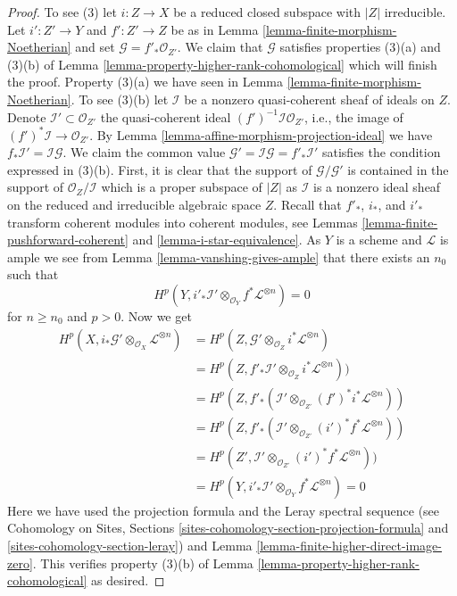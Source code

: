 \begin{proof}
\medskip\noindent
To see (3) let $i : Z \to X$ be a reduced closed subspace with $|Z|$
irreducible. Let $i' : Z' \to Y$ and $f' : Z' \to Z$ be as in
Lemma \ref{lemma-finite-morphism-Noetherian} and set
$\mathcal{G} = f'_*\mathcal{O}_{Z'}$. We claim that
$\mathcal{G}$ satisfies properties (3)(a) and (3)(b) of
Lemma \ref{lemma-property-higher-rank-cohomological}
which will finish the proof. Property (3)(a) we have seen in
Lemma \ref{lemma-finite-morphism-Noetherian}. To see (3)(b) let
$\mathcal{I}$ be a nonzero quasi-coherent sheaf of ideals on $Z$.
Denote $\mathcal{I}' \subset \mathcal{O}_{Z'}$ the quasi-coherent
ideal $(f')^{-1}\mathcal{I} \mathcal{O}_{Z'}$, i.e., the
image of $(f')^*\mathcal{I} \to \mathcal{O}_{Z'}$.
By Lemma \ref{lemma-affine-morphism-projection-ideal} we have
$f_*\mathcal{I}' = \mathcal{I} \mathcal{G}$. We claim the common value
$\mathcal{G}' = \mathcal{I} \mathcal{G} = f'_*\mathcal{I}'$
satisfies the condition expressed in (3)(b).
First, it is clear that the support of $\mathcal{G}/\mathcal{G}'$
is contained in the support of $\mathcal{O}_Z/\mathcal{I}$
which is a proper subspace of $|Z|$ as $\mathcal{I}$ is a
nonzero ideal sheaf on the reduced and irreducible algebraic space $Z$.
Recall that $f'_*$, $i_*$, and $i'_*$ transform coherent modules into
coherent modules, see Lemmas \ref{lemma-finite-pushforward-coherent} and
\ref{lemma-i-star-equivalence}.
As $Y$ is a scheme and $\mathcal{L}$ is ample
we see from Lemma \ref{lemma-vanshing-gives-ample}
that there exists an $n_0$ such that
$$
H^p(Y, i'_*\mathcal{I}' \otimes_{\mathcal{O}_Y} f^*\mathcal{L}^{\otimes n}) = 0
$$
for $n \geq n_0$ and $p > 0$. Now we get
\begin{align*}
H^p(X, i_*\mathcal{G}' \otimes_{\mathcal{O}_X} \mathcal{L}^{\otimes n})
& =
H^p(Z, \mathcal{G'} \otimes_{\mathcal{O}_Z} i^*\mathcal{L}^{\otimes n}) \\
& =
H^p(Z,
f'_*\mathcal{I}' \otimes_{\mathcal{O}_Z} i^*\mathcal{L}^{\otimes n})) \\
& =
H^p(Z, f'_*(\mathcal{I}' \otimes_{\mathcal{O}_{Z'}}
(f')^*i^*\mathcal{L}^{\otimes n})) \\
& =
H^p(Z, f'_*(\mathcal{I}' \otimes_{\mathcal{O}_{Z'}}
(i')^*f^*\mathcal{L}^{\otimes n})) \\
& =
H^p(Z',
\mathcal{I}' \otimes_{\mathcal{O}_{Z'}} (i')^*f^*\mathcal{L}^{\otimes n})) \\
& =
H^p(Y, i'_*\mathcal{I}' \otimes_{\mathcal{O}_Y} f^*\mathcal{L}^{\otimes n}) = 0
\end{align*}
Here we have used the projection formula and the Leray spectral sequence
(see Cohomology on Sites, Sections
\ref{sites-cohomology-section-projection-formula} and
\ref{sites-cohomology-section-leray})
and Lemma \ref{lemma-finite-higher-direct-image-zero}.
This verifies property (3)(b) of
Lemma \ref{lemma-property-higher-rank-cohomological} as desired.
\end{proof}










